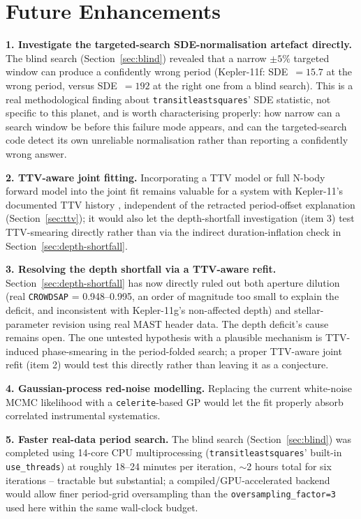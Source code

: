 \documentclass[11pt]{article}
\begin{document}
\section{Future Enhancements}

\textbf{1. Investigate the targeted-search SDE-normalisation artefact directly.} The blind search (Section~\ref{sec:blind}) revealed that a narrow $\pm5\%$ targeted window can produce a confidently wrong period (Kepler-11f: SDE~$=15.7$ at the wrong period, versus SDE~$=192$ at the right one from a blind search). This is a real methodological finding about \texttt{transitleastsquares}' SDE statistic, not specific to this planet, and is worth characterising properly: how narrow can a search window be before this failure mode appears, and can the targeted-search code detect its own unreliable normalisation rather than reporting a confidently wrong answer.

\textbf{2. TTV-aware joint fitting.} Incorporating a TTV model \citep{Lithwick2012} or full N-body forward model \citep[TTVFast;][]{Deck2014,Agol2016} into the joint fit remains valuable for a system with Kepler-11's documented TTV history \citep{Lissauer2011,Ford2012}, independent of the retracted period-offset explanation (Section~\ref{sec:ttv}); it would also let the depth-shortfall investigation (item 3) test TTV-smearing directly rather than via the indirect duration-inflation check in Section~\ref{sec:depth-shortfall}.

\textbf{3. Resolving the depth shortfall via a TTV-aware refit.} Section~\ref{sec:depth-shortfall} has now directly ruled out both aperture dilution (real \texttt{CROWDSAP} = 0.948--0.995, an order of magnitude too small to explain the deficit, and inconsistent with Kepler-11g's non-affected depth) and stellar-parameter revision \citep[][revises derived planet radius, not measured depth]{Bedell2017} using real MAST header data. The depth deficit's cause remains open. The one untested hypothesis with a plausible mechanism is TTV-induced phase-smearing in the period-folded search; a proper TTV-aware joint refit (item 2) would test this directly rather than leaving it as a conjecture.

\textbf{4. Gaussian-process red-noise modelling.} Replacing the current white-noise MCMC likelihood with a \texttt{celerite}-based GP \citep{ForemanMackey2017} would let the fit properly absorb correlated instrumental systematics.

\textbf{5. Faster real-data period search.} The blind search (Section~\ref{sec:blind}) was completed using 14-core CPU multiprocessing (\texttt{transitleastsquares}' built-in \texttt{use\_threads}) at roughly 18--24 minutes per iteration, $\sim$2 hours total for six iterations -- tractable but substantial; a compiled/GPU-accelerated backend would allow finer period-grid oversampling than the \texttt{oversampling\_factor=3} used here within the same wall-clock budget.
\end{document}
